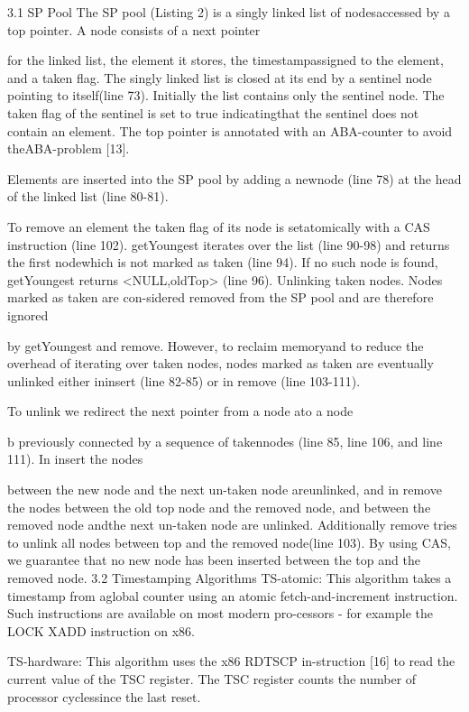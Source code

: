 3.1 SP Pool
The SP pool (Listing 2) is a singly linked list of nodesaccessed by a top pointer. A node consists of a next pointer

for the linked list, the element it stores, the timestampassigned to the element, and a taken flag. The singly linked
list is closed at its end by a sentinel node pointing to itself(line 73). Initially the list contains only the sentinel node.
The taken flag of the sentinel is set to true indicatingthat the sentinel does not contain an element. The top
pointer is annotated with an ABA-counter to avoid theABA-problem [13].

Elements are inserted into the SP pool by adding a newnode (line 78) at the head of the linked list (line 80-81).

To remove an element the taken flag of its node is setatomically with a CAS instruction (line 102). getYoungest
iterates over the list (line 90-98) and returns the first nodewhich is not marked as taken (line 94). If no such node is
found, getYoungest returns <NULL,oldTop> (line 96).
Unlinking taken nodes. Nodes marked as taken are con-sidered removed from the SP pool and are therefore ignored

by getYoungest and remove. However, to reclaim memoryand to reduce the overhead of iterating over taken nodes,
nodes marked as taken are eventually unlinked either ininsert (line 82-85) or in remove (line 103-111).

To unlink we redirect the next pointer from a node ato a node

b previously connected by a sequence of takennodes (line 85, line 106, and line 111). In insert the nodes

between the new node and the next un-taken node areunlinked, and in remove the nodes between the old top node
and the removed node, and between the removed node andthe next un-taken node are unlinked. Additionally remove
tries to unlink all nodes between top and the removed node(line 103). By using CAS, we guarantee that no new node has
been inserted between the top and the removed node.
3.2 Timestamping Algorithms
TS-atomic: This algorithm takes a timestamp from aglobal counter using an atomic fetch-and-increment instruction. Such instructions are available on most modern pro-cessors - for example the LOCK XADD instruction on x86.

TS-hardware: This algorithm uses the x86 RDTSCP in-struction [16] to read the current value of the TSC register. The TSC register counts the number of processor cyclessince the last reset.

